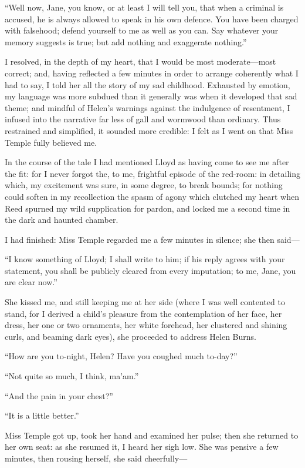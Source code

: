 \enquote{Well now, Jane, you know, or at least I will tell you, that
when a criminal is accused, he is always allowed to speak in his own
defence. You have been charged with falsehood; defend yourself to me as
well as you can. Say whatever your memory suggests is true; but add
nothing and exaggerate nothing.}

I resolved, in the depth of my heart, that I would be most
moderate---most correct; and, having reflected a few minutes in order to
arrange coherently what I had to say, I told her all the story of my sad
childhood. Exhausted by emotion, my language was more subdued than it
generally was when it developed that sad theme; and mindful of Helen's
warnings against the indulgence of resentment, I infused into the
narrative far less of gall and wormwood than ordinary. Thus restrained
and simplified, it sounded more credible: I felt as I went on that Miss
Temple fully believed me.

In the course of the tale I had mentioned \Mr{} Lloyd as having come to
see me after the fit: for I never forgot the, to me, frightful episode
of the red-room: in detailing which, my excitement was sure, in some
degree, to break bounds; for nothing could soften in my recollection the
spasm of agony which clutched my heart when \Mrs{} Reed spurned my wild
supplication for pardon, and locked me a second time in the dark and
haunted chamber.

I had finished: Miss Temple regarded me a few minutes in silence; she
then said---

\enquote{I know something of \Mr{} Lloyd; I shall write to him; if his
reply agrees with your statement, you shall be publicly cleared from
every imputation; to me, Jane, you are clear now.}

She kissed me, and still keeping me at her side (where I was well
contented to stand, for I derived a child's pleasure from the
contemplation of her face, her dress, her one or two ornaments, her
white forehead, her clustered and shining curls, and beaming dark eyes),
she proceeded to address Helen Burns.

\enquote{How are you to-night, Helen? Have you coughed much to-day?}

\enquote{Not quite so much, I think, ma'am.}

\enquote{And the pain in your chest?}

\enquote{It is a little better.}

Miss Temple got up, took her hand and examined her pulse; then she
returned to her own seat: as she resumed it, I heard her sigh low. She
was pensive a few minutes, then rousing herself, she said cheerfully---

